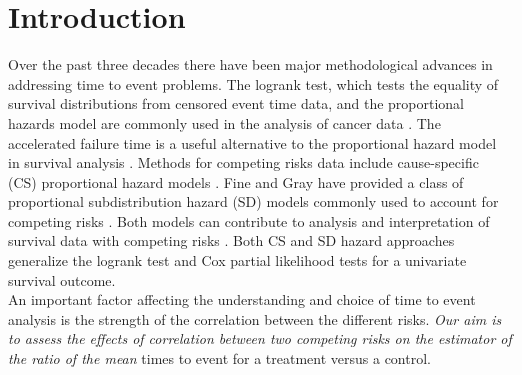 \documentclass[twoside,a4paper,12pt]{article}
\theoremstyle{plain}
\theoremstyle{definition}
\begin{document}





\section{Introduction}

Over the past three decades there have been major methodological advances in 
addressing time to event problems. 
The logrank test, which tests the equality of survival distributions from 
censored event time data, \citep{Mantel1959} and the proportional hazards model 
are commonly used in the analysis of cancer data \citep{Cox1972}. 
The accelerated failure time is a useful alternative to the proportional hazard 
model in survival analysis \citep{Wei1992}. 
Methods for competing risks data include cause-specific (CS) proportional hazard 
models \citep{Prentice1978}. 
Fine and Gray have provided a class of proportional subdistribution hazard (SD) 
models commonly used to account for competing risks \citep{Gray1988,Fine1999}. 
Both models can contribute to analysis and interpretation of survival data with 
competing risks  \citep{Dignam2008,Dignam2012}.
Both CS and SD hazard approaches generalize the logrank test and Cox partial 
likelihood tests for a univariate survival outcome. 
\\

An important factor affecting the understanding and choice of time to event 
analysis is the strength of the correlation between the different risks. 
\emph{Our aim is to assess the effects of correlation between two competing 
risks on the estimator of the ratio of the mean} times to event for a 
treatment versus a control. \\
\end{document}
